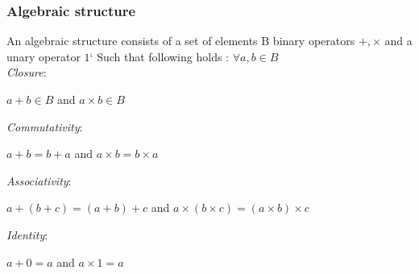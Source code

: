 \begin{frame}\frametitle{Algebraic structure}

An algebraic structure consists of
a set of elements B 
binary operators ${+, \times}$
and a unary operator ${1‘ }$
Such that following holds :
$\forall a,b \in B $\\
\textit{Closure}:\begin{center}

$a+b \in  B$	and	$a\times b \in B$ \end{center}


\textit{Commutativity}: \begin{center}

$a+b = b+a$	and	$a\times b = b\times a$
\end{center}

\textit{Associativity}: 
\begin{center}
 

$a+(b+c)=(a+b)+c$ and	$a\times (b\times c) = (a\times b)\times c$ 
\end{center}


\textit{Identity}: 
\begin{center}

$a+0 =  a$		and	$a\times 1=a$ 
\end{center}

\end{frame}

